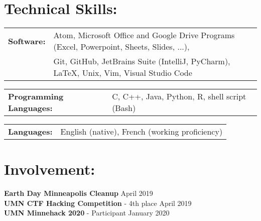 \documentclass[10pt]{article}
\begin{document}
	\hrulefill	
	
	\section*{Technical Skills:}
		\begin{tabular}{@{}l@{\ }l}
		\textbf{Software: } & Atom, Microsoft Office and Google Drive Programs (Excel, Powerpoint, Sheets, Slides, ...), \\ & Git, GitHub, JetBrains Suite (IntelliJ, PyCharm), {\large \LaTeX}, Unix, Vim, Visual Studio Code
		\end{tabular}
		
		\vspace{5pt}
		\noindent
		\begin{tabular}{@{}l@{\ }l}
		\textbf{Programming Languages: } & C, C++, Java, Python, R, shell script (Bash) \\
		\end{tabular}
		
		\vspace{5pt}
		\noindent
		\begin{tabular}{@{}l@{\ }l}
		\textbf{Languages: } & English (native), French (working proficiency) \\
		\end{tabular}
		
		
	\hrulefill
	
	\section*{Involvement:}
		\textbf{Earth Day Minneapolis Cleanup} \hfill April 2019 \\
		\textbf{UMN CTF Hacking Competition} - 4th place \hfill April 2019 \\
		\textbf{UMN Minnehack 2020 } - Participant \hfill January 2020\\
		
\end{document}
